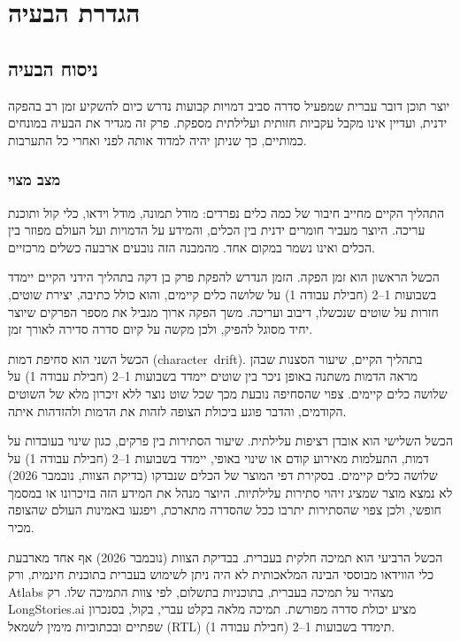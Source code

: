 \chapter{הגדרת הבעיה}

\section{ניסוח הבעיה}
יוצר תוכן דובר עברית שמפעיל סדרה סביב דמויות קבועות נדרש כיום להשקיע זמן רב בהפקה ידנית, ועדיין אינו מקבל עקביות חזותית ועלילתית מספקת. פרק זה מגדיר את הבעיה במונחים כמותיים, כך שניתן יהיה למדוד אותה לפני ואחרי כל התערבות.

\subsection{מצב מצוי}
התהליך הקיים מחייב חיבור של כמה כלים נפרדים: מודל תמונה, מודל וידאו, כלי קול ותוכנת עריכה. היוצר מעביר חומרים ידנית בין הכלים, והמידע על הדמויות ועל העולם מפוזר בין הכלים ואינו נשמר במקום אחד. מהמבנה הזה נובעים ארבעה כשלים מרכזיים.

הכשל הראשון הוא זמן הפקה. הזמן הנדרש להפקת פרק בן דקה בתהליך הידני הקיים יימדד בשבועות \textenglish{1–2} (חבילת עבודה 1) על שלושה כלים קיימים, והוא כולל כתיבה, יצירת שוטים, חזרות על שוטים שנכשלו, דיבוב ועריכה. משך הפקה ארוך מגביל את מספר הפרקים שיוצר יחיד מסוגל להפיק, ולכן מקשה על קיום סדרה סדירה לאורך זמן.

הכשל השני הוא סחיפת דמות (\mbox{\textenglish{character drift}}). בתהליך הקיים, שיעור הסצנות שבהן מראה הדמות משתנה באופן ניכר בין שוטים יימדד בשבועות \textenglish{1–2} (חבילת עבודה 1) על שלושה כלים קיימים. צפוי שהסחיפה נובעת מכך שכל שוט נוצר ללא זיכרון מלא של השוטים הקודמים, והדבר פוגע ביכולת הצופה לזהות את הדמות ולהזדהות איתה.

הכשל השלישי הוא אובדן רציפות עלילתית. שיעור הסתירות בין פרקים, כגון שינוי בעובדות על דמות, התעלמות מאירוע קודם או שינוי באופי, יימדד בשבועות \textenglish{1–2} (חבילת עבודה 1) על שלושה כלים קיימים. בסקירת דפי המוצר של הכלים שנבדקו (בדיקת הצוות, נובמבר 2026) לא נמצא מוצר שמציג זיהוי סתירות עלילתיות. היוצר מנהל את המידע הזה בזיכרונו או במסמך חופשי, ולכן צפוי שהסתירות יתרבו ככל שהסדרה מתארכת, ויפגעו באמינות העולם שהצופה מכיר.

הכשל הרביעי הוא תמיכה חלקית בעברית. בבדיקת הצוות (נובמבר 2026) אף אחד מארבעת כלי הווידאו מבוססי הבינה המלאכותית לא היה ניתן לשימוש בעברית בתוכנית חינמית, ורק \textenglish{Atlabs} מצהיר על תמיכה בעברית, בתוכניות בתשלום, לפי צוות התמיכה שלו. רק \textenglish{LongStories.ai} מציע יכולת סדרה מפורשת. תמיכה מלאה בקלט עברי, בקול, בסנכרון שפתיים ובכתוביות מימין לשמאל (\textenglish{RTL}) תימדד בשבועות \textenglish{1–2} (חבילת עבודה 1).

